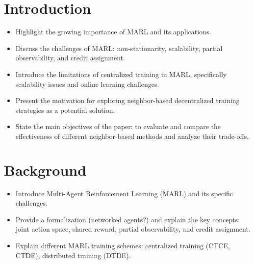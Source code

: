 \documentclass[sigconf]{acmart}
\begin{document}
\maketitle

\section{Introduction}
\begin{itemize}
\item Highlight the growing importance of MARL and its applications.
\item Discuss the challenges of MARL: non-stationarity, scalability, partial observability, and credit assignment.
\item Introduce the limitations of centralized training in MARL, specifically scalability issues and online learning challenges.
\item Present the motivation for exploring neighbor-based decentralized training strategies as a potential solution.
\item State the main objectives of the paper: to evaluate and compare the effectiveness of different neighbor-based methods and analyze their trade-offs.
\end{itemize}

\section{Background}
\begin{itemize}
\item Introduce Multi-Agent Reinforcement Learning (MARL) and its specific challenges.
\item Provide a formalization (networked agents?) and explain the key concepts: joint action space, shared reward, partial observability, and credit assignment.
\item Explain different MARL training schemes: centralized training (CTCE, CTDE), distributed training (DTDE).
\end{itemize}
\end{document}
